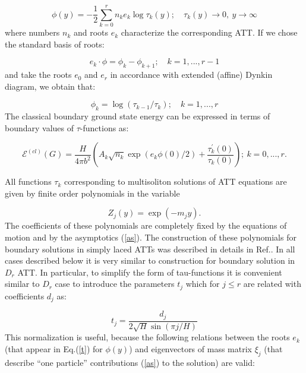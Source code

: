 \documentclass[a4paper,12pt,titlepage,final]{article}
\begin{document}
\begin{equation}
\phi (y)=-\frac{1}{2}\sum_{k=0}^{r}n_{k}e_{k}\log \tau _{k}(y);\quad \tau
_{k}(y)\rightarrow 0,~y\rightarrow \infty  \label{t}
\end{equation}
where numbers $n_{k}$ and roots $e_{k}$ characterize the corresponding ATT.
If we chose the standard basis of roots:

\begin{equation}
e_{k}\cdot \phi =\phi _{k}-\phi _{k+1};\quad k=1,...,r-1  \label{SB}
\end{equation}
and take the roots $e_{0}$ and $e_{r}$ in accordance with extended (affine)
Dynkin diagram, we obtain that:

\begin{equation}
\phi _{k}=\log (\tau _{k-1}/\tau _{k});\quad k=1,...,r  \label{fii}
\end{equation}
The classical boundary ground state energy can be expressed in terms of
boundary values of $\tau $-functions \cite{BOWC} as:

\begin{equation}
\mathcal{E}^{(cl)}(G)=\frac{H}{4\pi b^{2}}\left( A_{k}\sqrt{n_{k}}\exp
(e_{k}\phi (0)/2)+\frac{\tau _{k}^{\prime }(0)}{\tau _{k}(0)}\right)
;~k=0,...,r.  \label{en}
\end{equation}

All functions $\tau _{k}$ corresponding to multisoliton solutions of ATT
equations are given by finite order polynomials in the variable

\begin{equation}
Z_{j}(y)=\exp (-m_{j}y).  \label{Z}
\end{equation}
The coefficients of these polynomials are completely fixed by the equations
of motion and by the asymptotics (\ref{as}). The construction of these
polynomials for boundary solutions in simply laced ATTs was described in
details in Ref.\cite{FO}. In all cases described below it is very similar to
construction for boundary solution in $D_{r}$ ATT. In particular, to
simplify the form of tau-functions it is convenient similar to $D_{r}$ case
to introduce the parameters $t_{j}$ which for $j\leq r$ are related with
coefficients $d_{j}$ as:

\begin{equation}
t_{j}=\frac{d_{j}}{2\sqrt{H}\sin (\pi j/H)}  \label{tj}
\end{equation}
This normalization is useful, because
the following relations between the roots $e_{k}$ (that appear
in Eq.(\ref{t}) for $\phi(y)$) and eigenvectors of mass
matrix $\xi _{j}$ (that describe
 ``one particle'' contributions (\ref{as}) to the solution) are valid:
\end{document}
